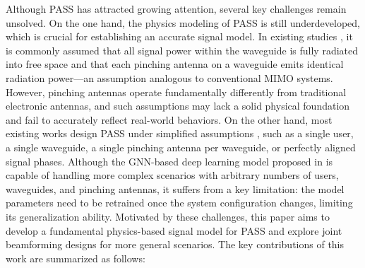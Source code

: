 Although PASS has attracted growing attention, several key challenges remain unsolved. On the one hand, the physics modeling of PASS is still underdeveloped, which is crucial for establishing an accurate signal model. In existing studies \cite{ding2024flexible, ouyang2025array, bereyhi2025downlink, guo2025deep}, it is commonly assumed that all signal power within the waveguide is fully radiated into free space and that each pinching antenna on a waveguide emits identical radiation power—an assumption analogous to conventional MIMO systems. However, pinching antennas operate fundamentally differently from traditional electronic antennas, and such assumptions may lack a solid physical foundation and fail to accurately reflect real-world behaviors. On the other hand, most existing works design PASS under simplified assumptions \cite{ding2024flexible, ouyang2025array, bereyhi2025downlink}, such as a single user, a single waveguide, a single pinching antenna per waveguide, or perfectly aligned signal phases. Although the GNN-based deep learning model proposed in \cite{guo2025deep} is capable of handling more complex scenarios with arbitrary numbers of users, waveguides, and pinching antennas, it suffers from a key limitation: the model parameters need to be retrained once the system configuration changes, limiting its generalization ability. Motivated by these challenges, this paper aims to develop a fundamental physics-based signal model for PASS and explore joint beamforming designs for more general scenarios. The key contributions of this work are summarized as follows:
